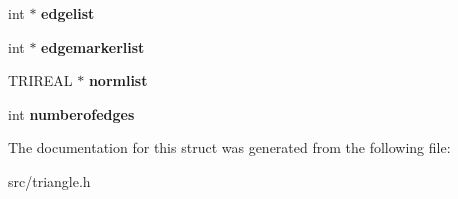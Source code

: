 \begin{DoxyCompactItemize}
\item 
\hypertarget{structtriangulateio_af8374f90431a318b694bb5424814f111}{
int $\ast$ {\bfseries edgelist}}
\label{structtriangulateio_af8374f90431a318b694bb5424814f111}

\item 
\hypertarget{structtriangulateio_a3f9be953734099d409f54736c3cd72af}{
int $\ast$ {\bfseries edgemarkerlist}}
\label{structtriangulateio_a3f9be953734099d409f54736c3cd72af}

\item 
\hypertarget{structtriangulateio_a0b1c374976e8352386ee4f4ac4b4fcff}{
TRIREAL $\ast$ {\bfseries normlist}}
\label{structtriangulateio_a0b1c374976e8352386ee4f4ac4b4fcff}

\item 
\hypertarget{structtriangulateio_ac8c1b394861ed4a5c021a2d08a36a2a9}{
int {\bfseries numberofedges}}
\label{structtriangulateio_ac8c1b394861ed4a5c021a2d08a36a2a9}

\end{DoxyCompactItemize}


The documentation for this struct was generated from the following file:\begin{DoxyCompactItemize}
\item 
src/triangle.h\end{DoxyCompactItemize}
